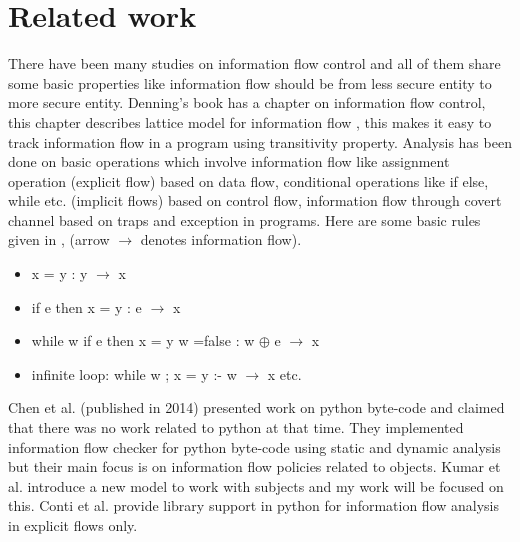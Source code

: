 \chapter{Related work}
\label{ch:related}
There have been many studies on information flow control and all of them share some basic properties like information flow should be from less secure entity to more secure entity. Denning's book \cite{denning} has a chapter on information flow control, this chapter describes lattice model for information flow \cite{lattice}, this makes it easy to track information flow in a program using transitivity property. Analysis has been done on basic operations which involve information flow like assignment operation (explicit flow) based on data flow, conditional operations like if else, while etc. (implicit flows) based on control flow, information flow through covert channel based on traps and exception in programs. Here are some basic rules given in \cite{denning}, (arrow $\rightarrow$ denotes information flow).  
\begin{itemize}
	\item x = y : y $\rightarrow$ x
	\item if e then x = y : e $\rightarrow$ x
	\item while w {if e then{ x = y} w =false } : w $\oplus$ e $\rightarrow$ x
	\item infinite loop: while w {}; x = y :- w $\rightarrow$ x etc.   
\end{itemize}
Chen et al. \cite{hybrid}(published in 2014) presented work on python byte-code and claimed that there was no work related to python at that time. They implemented information flow checker for python byte-code using static and dynamic analysis but their main focus is on information flow policies related to objects. Kumar et al. \cite{rwfm} introduce a new model to work with subjects and my work will be focused on this. Conti et al. \cite{taint} provide library support in python for information flow analysis in explicit flows only.       
  
